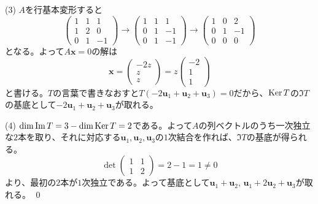 \noindent (3) $A$を行基本変形すると
\[
\begin{pmatrix}
1 & 1 & 1 \\
1 & 2 & 0 \\
0 & 1 & -1
\end{pmatrix}
\rightarrow
\begin{pmatrix}
1 & 1 & 1 \\
0 & 1 & -1 \\
0 & 1 & -1
\end{pmatrix}
\rightarrow
\begin{pmatrix}
1 & 0 & 2 \\
0 & 1 & -1 \\
0 & 0 & 0
\end{pmatrix}
\]
となる。よって$A\bm{x} = 0$の解は
\[
\bm{x} = 
\begin{pmatrix}
-2z \\
z \\
z
\end{pmatrix}
=
z
\begin{pmatrix}
-2 \\
1 \\
1
\end{pmatrix}
\]
と書ける。$T$の言葉で書きなおすと$T(-2\bm{u}_1 + \bm{u}_2 + \bm{u}_3) = 0$だから、$\operatorname{Ker} T$の$\Im T$の基底として$-2 \bm{u}_1 + \bm{u}_2 + \bm{u}_3$が取れる。

\noindent (4) $\dim \mathrm{Im}\, T = 3 - \dim \operatorname{Ker} T = 2$である。よって$A$の列ベクトルのうち一次独立な$2$本を取り、それに対応する$\bm{u}_1, \bm{u}_2, \bm{u}_3$の$1$次結合を作れば、$\Im T$の基底が得られる。
\[
\det
\begin{pmatrix}
1 & 1 \\
1 & 2
\end{pmatrix}
= 2 - 1 = 1 \neq 0
\]
より、最初の$2$本が$1$次独立である。よって基底として$\bm{u}_1 + \bm{u}_2$, $\bm{u}_1 + 2\bm{u}_2 + \bm{u}_3$が取れる。 \qed


